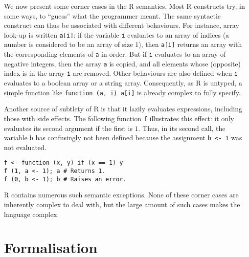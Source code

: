 \documentclass[9pt, sigplan, natbib=false, screen=true]{acmart}
\newcommand\R{R}
\begin{document}
We now present some corner cases in the \R{} semantics.
Most \R{} constructs
try, in some ways, to ``guess'' what the programmer meant.
The same syntactic construct can thus be associated
with different behaviours.
For instance, array look-up is written \texttt{a[i]}:
if the variable \texttt{i} evaluates to an array of indices
(a number is considered to be an array of size \(1\)),
then \texttt{a[i]} returns an array with
the corresponding elements of \texttt{a} in order.
But if \texttt{i} evaluates to an array of negative integers,
then the array \texttt{a} is copied,
and all elements whose (opposite) index is in the array \texttt{i}
are removed.
Other behaviours are also defined when \texttt{i}
evaluates to a boolean array or a string array.
Consequently,
as \R{} is untyped,
a simple function like \texttt{function (a, i) a[i]}
is already complex to fully specify.

Another source of subtlety of \R{} is that it lazily evaluates expressions,
including those with side effects.
The following function \texttt{f} illustrates this effect:
it only evaluates its second argument if the first is \(1\).
Thus, in its second call, the variable \texttt{b}
has confusingly not been defined because the assignment \texttt{b <- 1}
was not evaluated.
\begin{verbatim}
f <- function (x, y) if (x == 1) y
f (1, a <- 1); a # Returns 1.
f (0, b <- 1); b # Raises an error.
\end{verbatim}

\R{} contains numerous such semantic exceptions.
None of these corner cases are inherently complex to deal with,
but the large amount of such cases makes the language complex.


\section{Formalisation}
\label{sec:formalisation}
\end{document}
